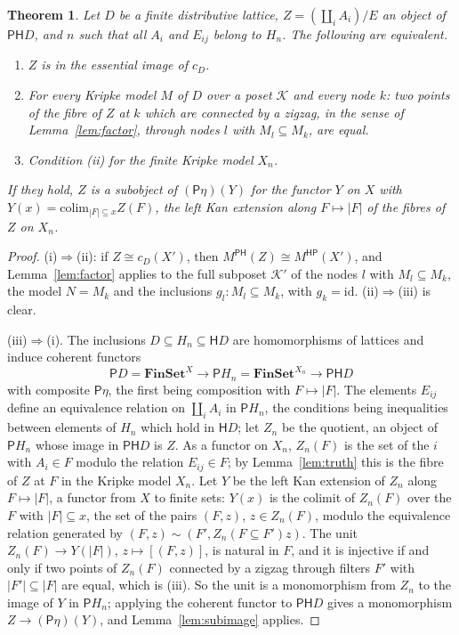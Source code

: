 \documentclass[11pt]{amsart}
\newtheorem{thm}{Theorem}[section]
\theoremstyle{definition}
\newcommand{\PP}{\mathsf P}
\newcommand{\HH}{\mathsf H}
\newcommand{\cK}{\mathcal K}
\begin{document}
\begin{thm}\label{thm:image}
Let $D$ be a finite distributive lattice, $Z=(\coprod_iA_i)/E$ an
object of $\PP\HH D$, and $n$ such that all $A_i$ and $E_{ij}$ belong
to $H_n$. The following are equivalent.
\begin{enumerate}
\item[(i)] $Z$ is in the essential image of $c_D$.
\item[(ii)] For every Kripke model $M$ of $D$ over a poset $\cK$ and
every node $k$: two points of the fibre of $Z$ at $k$ which are
connected by a zigzag, in the sense of Lemma~\ref{lem:factor}, through
nodes $l$ with $M_l\subseteq M_k$, are equal.
\item[(iii)] Condition (ii) for the finite Kripke model $X_n$.
\end{enumerate}
If they hold, $Z$ is a subobject of $(\PP\eta)(Y)$ for the functor $Y$
on $X$ with $Y(x)=\mathrm{colim}_{|F|\subseteq x}Z(F)$, the left Kan
extension along $F\mapsto|F|$ of the fibres of $Z$ on $X_n$.
\end{thm}
\begin{proof}
(i)$\Rightarrow$(ii): if $Z\cong c_D(X')$, then $M^{\PP\HH}(Z)\cong
M^{\HH\PP}(X')$, and Lemma~\ref{lem:factor} applies to the full
subposet $\cK'$ of the nodes $l$ with $M_l\subseteq M_k$, the model
$N=M_k$ and the inclusions $g_l\colon M_l\subseteq M_k$, with
$g_k=\mathrm{id}$. (ii)$\Rightarrow$(iii) is clear.

(iii)$\Rightarrow$(i). The inclusions $D\subseteq H_n\subseteq\HH D$
are homomorphisms of lattices and induce coherent functors
\[
\PP D=\mathbf{FinSet}^X\longrightarrow\PP H_n=\mathbf{FinSet}^{X_n}
\longrightarrow\PP\HH D
\]
with composite $\PP\eta$, the first being composition with
$F\mapsto|F|$. The elements $E_{ij}$ define an equivalence relation on
$\coprod_iA_i$ in $\PP H_n$, the conditions being inequalities between
elements of $H_n$ which hold in $\HH D$; let $Z_n$ be the quotient, an
object of $\PP H_n$ whose image in $\PP\HH D$ is $Z$. As a functor on
$X_n$, $Z_n(F)$ is the set of the $i$ with $A_i\in F$ modulo the
relation $E_{ij}\in F$; by Lemma~\ref{lem:truth} this is the fibre of
$Z$ at $F$ in the Kripke model $X_n$. Let $Y$ be the left Kan extension
of $Z_n$ along $F\mapsto|F|$, a functor from $X$ to finite sets: $Y(x)$
is the colimit of $Z_n(F)$ over the $F$ with $|F|\subseteq x$, the set
of the pairs $(F,z)$, $z\in Z_n(F)$, modulo the equivalence relation
generated by $(F,z)\sim(F',Z_n(F\subseteq F')z)$. The unit
$Z_n(F)\to Y(|F|)$, $z\mapsto[(F,z)]$, is natural in $F$, and it is
injective if and only if two points of $Z_n(F)$ connected by a zigzag
through filters $F'$ with $|F'|\subseteq|F|$ are equal, which is
(iii). So the unit is a monomorphism from $Z_n$ to the image of $Y$ in
$\PP H_n$; applying the coherent functor to $\PP\HH D$ gives a
monomorphism $Z\to(\PP\eta)(Y)$, and Lemma~\ref{lem:subimage} applies.
\end{proof}
\end{document}
